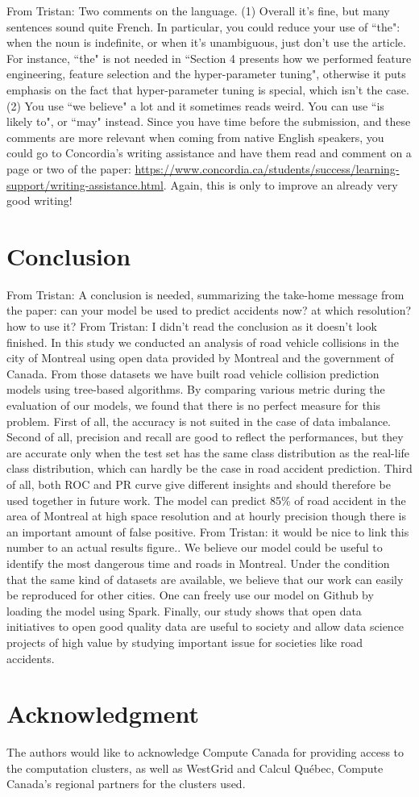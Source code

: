 \documentclass[conference]{IEEEtran}
\newcommand{\TG}[1]{\colorlet{saved}{.}\color{orange}From Tristan: #1\color{saved}}
\begin{document}
\TG{Two comments on the language. (1) Overall it's fine, but many sentences sound 
quite French. In particular, you could reduce your use of ``the": when the noun is indefinite, or when it's unambiguous, just don't use the article.  For instance, ``the" is not needed in ``Section
4 presents how we performed feature engineering, feature
selection and the hyper-parameter tuning", otherwise it puts emphasis on the fact that hyper-parameter tuning is special, which isn't the case. (2) You use ``we believe" a lot and it sometimes reads weird. You can use ``is likely to", or ``may" instead. Since you have time before the submission, and these comments are more relevant when coming from native English speakers, you could go to Concordia's writing assistance and have them read and comment on a page or two of the paper: \url{https://www.concordia.ca/students/success/learning-support/writing-assistance.html}. Again, this is only to improve an already very good writing!}

\section*{Conclusion}

\TG{A conclusion is needed, summarizing the take-home message from the paper:
can your model be used to predict accidents now? at which resolution? how to use it?}
\TG{I didn't read the conclusion as it doesn't look finished.}
In this study we conducted an analysis of road vehicle collisions in the city of Montreal using open data provided by Montreal and the government of Canada. From those datasets we have built road vehicle collision prediction models using tree-based algorithms. By comparing various metric during the evaluation of our models, we found that there is no perfect measure for this problem. First of all, the accuracy is not suited in the case of data imbalance. Second of all, precision and recall are good to reflect the performances, but they are accurate only when the test set has the same class distribution as the real-life class distribution, which can hardly be the case in road accident prediction. Third of all, both ROC and PR curve give different insights and should therefore be used together in future work. The model can predict 85\% of road accident in the area of Montreal at high space resolution and at hourly precision though there is an important amount of false positive. \TG{it would be nice to link this number to an actual results figure.}. We believe our model could be useful to identify the most dangerous time and roads in Montreal. Under the condition that the same kind of datasets are available, we believe that our work can easily be reproduced for other cities. One can freely use our model on Github by loading the model using Spark. Finally, our study shows that open data initiatives to open good quality data are useful to society and allow data science projects of high value by studying important issue for societies like road accidents. 

\section*{Acknowledgment}

The authors would like to acknowledge Compute Canada for providing access to the computation clusters, as well as WestGrid and Calcul Québec, Compute Canada's regional partners for the clusters used.



\end{document}
